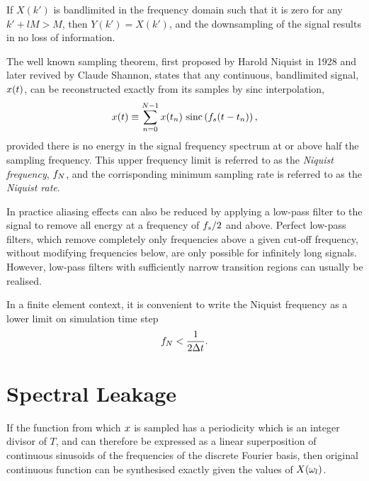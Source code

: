 If $X(k')$ is bandlimited in the frequency domain such that it is zero for any $k' + lM > M$, then $Y(k') = X(k')$, and the downsampling of the signal results in no loss of information.

The well known sampling theorem, first proposed by Harold Niquist in 1928 and
later revived by Claude Shannon, states that any continuous, bandlimited signal, $x(t)$, can be reconstructed exactly from its samples by sinc interpolation,
$$
x(t) \equiv \sum_{n=0}^{N-1} x(t_n) \
\textrm{sinc}\left( f_s (t-t_{n}) \right),
$$
provided there is no energy in the signal frequency spectrum at or above half
the sampling frequency. This upper frequency limit is referred to as the
\textit{Niquist frequency}, $f_N$, and the corrisponding minimum sampling rate is referred to as the \textit{Niquist rate}.

In practice aliasing effects can also be reduced by applying a low-pass filter to the signal to remove all energy at a frequency of $f_s / 2$ and above. Perfect low-pass filters, which remove completely only frequencies above a given cut-off frequency, without modifying frequencies below, are only possible for infinitely long signals. However, low-pass filters with sufficiently narrow transition regions can usually be realised.

In a finite element context, it is convenient to write the Niquist frequency as a lower limit on simulation time step
$$
f_N < \frac{1}{2 \Delta t} .
$$


\section{Spectral Leakage}
If the function from which $x$ is sampled has a periodicity which is an integer divisor of $T$, and can therefore be expressed as a linear superposition of continuous sinusoids of the frequencies of the discrete Fourier basis, then original continuous function can be synthesised exactly given the values of $X(\omega_{l})$.


